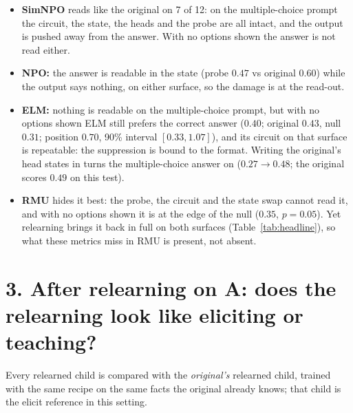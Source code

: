 \documentclass[11pt]{article}
\newenvironment{steps}{\begin{itemize}[nosep,leftmargin=1.2em,topsep=2pt]}{\end{itemize}}
\begin{document}
\begin{steps}
\item \textbf{SimNPO} reads like the original on 7 of 12: on the multiple-choice prompt the circuit,
the state, the heads and the probe are all intact, and the output is pushed away from the answer.
With no options shown the answer is not read either.
\item \textbf{NPO:} the answer is readable in the state (probe $0.47$ vs original $0.60$) while the
output says nothing, on either surface, so the damage is at the read-out.
\item \textbf{ELM:} nothing is readable on the multiple-choice prompt, but with no options shown ELM
still prefers the correct answer ($0.40$; original $0.43$, null $0.31$; position $0.70$, 90\%
interval $[0.33, 1.07]$), and its circuit on that surface is repeatable: the suppression is bound to
the format. Writing the original's head states
in turns the multiple-choice answer on ($0.27\to0.48$; the original scores $0.49$ on this test).
\item \textbf{RMU} hides it best: the probe, the circuit and the state swap cannot read it, and
with no options shown it is at the edge of the null ($0.35$, $p=0.05$). Yet relearning brings it
back in full on both surfaces (Table~\ref{tab:headline}), so what these metrics miss in RMU is
present, not absent.
\end{steps}

\section*{3. After relearning on A: does the relearning look like eliciting or teaching?}

Every relearned child is compared with the \emph{original's} relearned child, trained with the same
recipe on the same facts the original already knows; that child is the elicit reference in this
setting.
\end{document}
